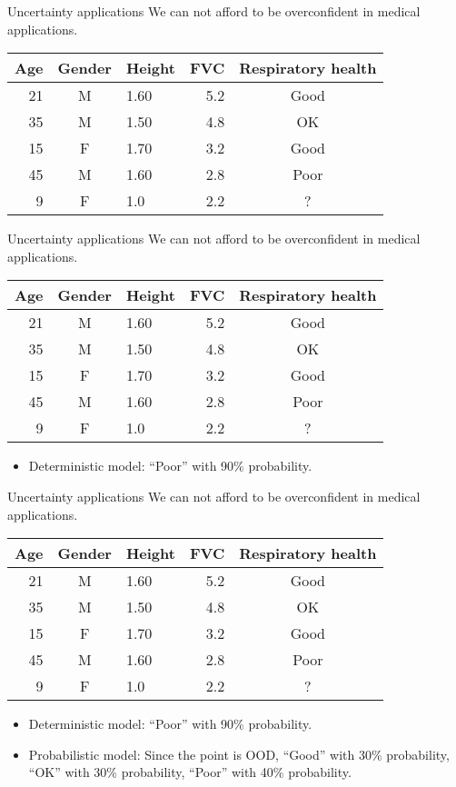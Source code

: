\documentclass[handout]{beamer}
\begin{document}
\newcommand{\uncertaintyTable}{\begin{table}
        \begin{tabular}{|r|c|l|r|c|}
            \hline
            Age & Gender & Height & FVC & Respiratory health \\
            \hline
            21  & M      & 1.60   & 5.2 & Good               \\
            35  & M      & 1.50   & 4.8 & OK                 \\
            15  & F      & 1.70   & 3.2 & Good               \\
            45  & M      & 1.60   & 2.8 & Poor               \\
            \hline
            9   & F      & 1.0    & 2.2 & ?                  \\
            \hline
        \end{tabular}
    \end{table}}

\begin{frame}{Uncertainty applications}
    We can not afford to be overconfident in medical applications.

    \uncertaintyTable

\end{frame}

\begin{frame}{Uncertainty applications}
    We can not afford to be overconfident in medical applications.

    \uncertaintyTable

    \begin{itemize}
        \item Deterministic model: ``Poor'' with 90\% probability.
    \end{itemize}

\end{frame}

\begin{frame}{Uncertainty applications}
    We can not afford to be overconfident in medical applications.

    \uncertaintyTable

    \begin{itemize}
        \item Deterministic model: ``Poor'' with 90\% probability.
        \item Probabilistic model: Since the point is OOD, ``Good'' with 30\% probability, ``OK'' with 30\% probability, ``Poor'' with 40\% probability.
    \end{itemize}

\end{frame}
\end{document}
